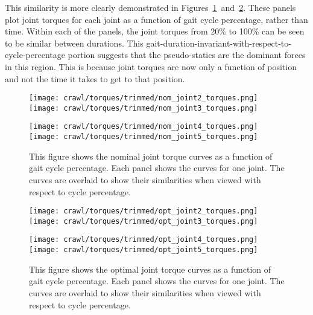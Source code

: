 This similarity is more clearly demonstrated in
Figures~\ref{fig:vrep_nom_joint_torques_by_joint_over_cycle1}~and~\ref{fig:vrep_opt_joint_torques_by_joint_over_cycle1}.
These panels plot joint torques
for each joint as a function of gait cycle percentage, rather than time. Within each of the
panels, the joint torques from 20\% to 100\% can be seen to be similar between durations. 
This gait-duration-invariant-with-respect-to-cycle-percentage portion suggests that
the pseudo-statics are the dominant forces in this region. This is because joint torques
are now only a function of position and not the time it takes to get to that position.

\begin{figure}
  \centerline{
    \texttt{[image: crawl/torques/trimmed/nom\_joint2\_torques.png]}
    \texttt{[image: crawl/torques/trimmed/nom\_joint3\_torques.png]}
  }
  \centerline{
    \texttt{[image: crawl/torques/trimmed/nom\_joint4\_torques.png]}
    \texttt{[image: crawl/torques/trimmed/nom\_joint5\_torques.png]}
  }
  \caption{This figure shows the nominal joint torque curves as a function of gait cycle percentage.
           Each panel shows the curves for one joint. The curves are overlaid to show their
           similarities when viewed with respect to cycle percentage.}
  \label{fig:vrep_nom_joint_torques_by_joint_over_cycle1}
\end{figure}

\begin{figure}
  \centerline{
    \texttt{[image: crawl/torques/trimmed/opt\_joint2\_torques.png]}
    \texttt{[image: crawl/torques/trimmed/opt\_joint3\_torques.png]}
  }
  \centerline{
    \texttt{[image: crawl/torques/trimmed/opt\_joint4\_torques.png]}
    \texttt{[image: crawl/torques/trimmed/opt\_joint5\_torques.png]}
  }
  \caption{This figure shows the optimal joint torque curves as a function of gait cycle percentage.
           Each panel shows the curves for one joint. The curves are overlaid to show their
           similarities when viewed with respect to cycle percentage.}
  \label{fig:vrep_opt_joint_torques_by_joint_over_cycle1}
\end{figure}

